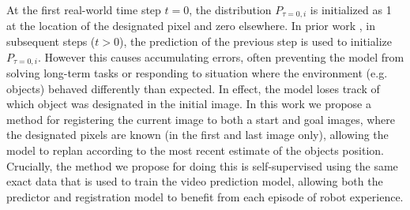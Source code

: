 At the first real-world time step $t=0$, the distribution $P_{\tau=0,i}$ is initialized as 1 at the location of the designated pixel and zero elsewhere. In prior work \cite{sna, foresight}, in subsequent steps ($t > 0$),  the prediction of the previous step is used to initialize $P_{\tau=0,i}$. However this causes accumulating errors, often preventing the model from solving long-term tasks or responding to situation where the environment (e.g. objects) behaved differently than expected. In effect, the model loses track of which object was designated in the initial image. In this work we propose a method for registering the current image to both a start and goal images, where the designated pixels are known (in the first and last image only), allowing the model to replan according to the most recent estimate of the objects position. Crucially, the method we propose for doing this is self-supervised using the same exact data that is used to train the video prediction model, allowing both the predictor and registration model to benefit from each episode of robot experience.




